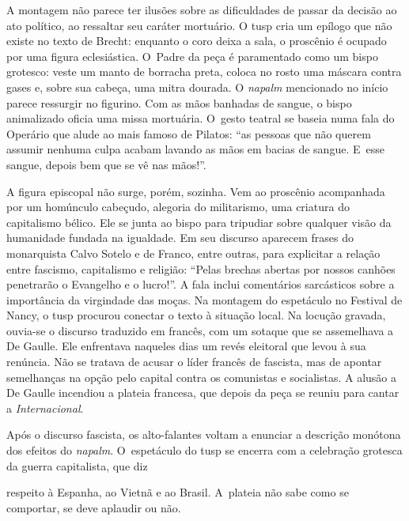 {A montagem não parece ter ilusões sobre as dificuldades de passar da
decisão ao ato político, ao ressaltar seu caráter mortuário. O {\sc tusp} cria
um epílogo que não existe no texto de Brecht: enquanto o coro deixa a
sala, o proscênio é ocupado por uma figura eclesiástica. O~Padre da peça
é paramentado como um bispo grotesco: veste um manto de borracha preta,
coloca no rosto uma máscara contra gases e, sobre sua cabeça, uma mitra
dourada. O {\it napalm} mencionado no início parece ressurgir no
figurino. Com as mãos banhadas de sangue, o bispo animalizado oficia uma
missa mortuária. O~gesto teatral se baseia numa fala do Operário que
alude ao mais famoso de Pilatos: “as pessoas que não querem assumir
nenhuma culpa acabam lavando as mãos em bacias de sangue. E~esse sangue,
depois bem que se vê nas mãos!”.

A figura episcopal não surge, porém, sozinha. Vem ao proscênio
acompanhada por um homúnculo cabeçudo, alegoria do militarismo, uma
criatura do capitalismo bélico. Ele se junta ao bispo para tripudiar
sobre qualquer visão da humanidade fundada na igualdade. Em seu discurso
aparecem frases do monarquista Calvo Sotelo e de Franco, entre outras,
para explicitar a relação entre fascismo, capitalismo e religião: “Pelas
brechas abertas por nossos canhões penetrarão o Evangelho e o lucro!”. A
fala inclui comentários sarcásticos sobre a importância da virgindade
das moças. Na montagem do espetáculo no Festival de Nancy, o {\sc tusp}
procurou conectar o texto à situação local. Na locução gravada, ouvia-se
o discurso traduzido em francês, com um sotaque que se assemelhava a De
Gaulle. Ele enfrentava naqueles dias um revés eleitoral que levou à sua
renúncia. Não se tratava de acusar o líder francês de fascista, mas de apontar
semelhanças na opção pelo capital contra os comunistas e socialistas. A
alusão a De Gaulle incendiou a plateia francesa, que depois da peça
se reuniu para cantar a {\it Internacional}.

Após o discurso fascista, os alto-falantes voltam a enunciar a descrição
monótona dos efeitos do {\it napalm}. O~espetáculo do {\sc tusp} se encerra
com a celebração grotesca da guerra capitalista, que diz

\column
\noindent{}respeito à
Espanha, ao Vietnã e ao Brasil. A~plateia não sabe como se comportar, se
deve aplaudir ou não.


}
